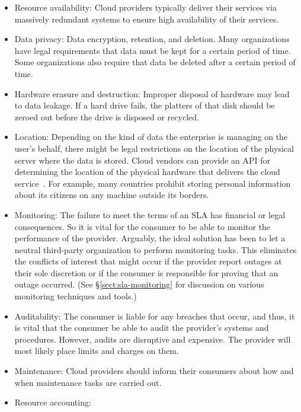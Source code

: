 \begin{itemize}
 \item Resource availability: Cloud providers typically deliver their services via massively redundant systems to ensure high availability of their services.
 
 \item Data privacy: Data encryption, retention, and deletion. Many organizations have legal requirements that data must be kept for a certain period of time. Some organizations also require that data be deleted after a certain period of time.
 
 \item Hardware erasure and destruction: Improper disposal of hardware may lead to data leakage. If a hard drive fails, the platters of that disk should be zeroed out before the drive is disposed or recycled.

 \item Location: Depending on the kind of data the enterprise is managing on the user's behalf, there might be legal restrictions on the location of the physical server where the data is stored. Cloud vendors can provide an API for determining the location of the physical hardware that delivers the cloud service~\cite{Ahr+10}. For example, many countries prohibit storing personal information about its citizens on any machine outside its borders.
 
 \item Monitoring: The failure to meet the terms of an SLA has financial or legal consequences. So it is vital for the consumer to be able to monitor the performance of the provider. Arguably, the ideal solution has been to let a neutral third-party organization to perform monitoring tasks. This eliminates the conflicts of interest that might occur if the provider report outages at their sole discretion or if the consumer is responsible for proving that an outage occurred. (See \S\ref{sect:sla-monitoring} for discussion on various monitoring techniques and tools.)
 
 \item Auditability: The consumer is liable for any breaches that occur, and thus, it is  vital that the consumer be able to audit the provider's systems and procedures. However, audits are disruptive and expensive. The provider will most likely place limits and charges on them.
 
 \item Maintenance: Cloud providers should inform their consumers about how and when maintenance tasks are carried out.

 \item Resource accounting:
\end{itemize}

